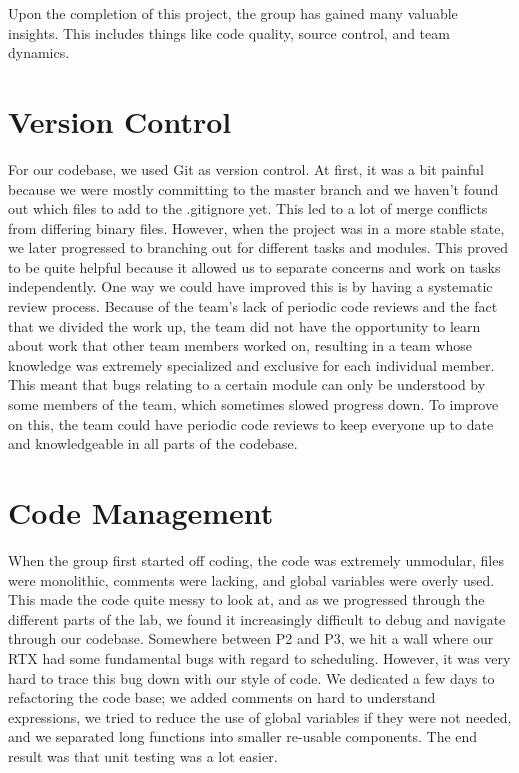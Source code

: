 \documentclass[12pt]{report}
\begin{document}
Upon the completion of this project, the group has gained many valuable insights. This includes things like code quality, source control, and team dynamics.

\section{Version Control}
For our codebase, we used Git as version control. At first, it was a bit painful because we were mostly committing to the master branch and we haven't found out which files to add to the .gitignore yet. This led to a lot of merge conflicts from differing binary files.
However, when the project was in a more stable state, we later progressed to branching out for different tasks and modules. This proved to be quite helpful because it allowed us to separate concerns and work on tasks independently.
One way we could have improved this is by having a systematic review process. Because of the team's lack of periodic code reviews and the fact that we divided the work up, the team did not have the opportunity to learn about work that other team members worked on, resulting in a team whose knowledge was extremely specialized and exclusive for each individual member. This meant that bugs relating to a certain module can only be understood by some members of the team, which sometimes slowed progress down. To improve on this, the team could have periodic code reviews to keep everyone up to date and knowledgeable in all parts of the codebase.

\section{Code Management}
When the group first started off coding, the code was extremely unmodular, files were monolithic, comments were lacking, and global variables were overly used. This made the code quite messy to look at, and as we progressed through the different parts of the lab, we found it increasingly difficult to debug and navigate through our codebase. Somewhere between P2 and P3, we hit a wall where our RTX had some fundamental bugs with regard to scheduling. However, it was very hard to trace this bug down with our style of code. We dedicated a few days to refactoring the code base; we added comments on hard to understand expressions, we tried to reduce the use of global variables if they were not needed, and we separated long functions into smaller re-usable components. The end result was that unit testing was a lot easier.
\end{document}
